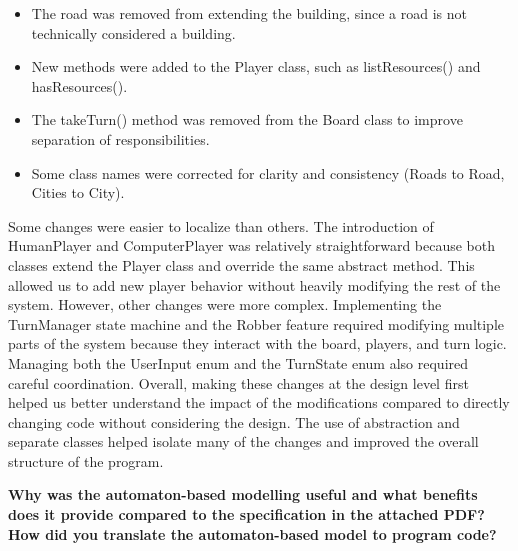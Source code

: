 \begin{itemize}
    \item The road was removed from extending the building, since a road is not technically considered a building. 
    \item New methods were added to the Player class, such as listResources() and hasResources().
    \item The takeTurn() method was removed from the Board class to improve separation of responsibilities.
    \item Some class names were corrected for clarity and consistency (Roads to Road, Cities to City). 
\end{itemize}
Some changes were easier to localize than others. The introduction of HumanPlayer and ComputerPlayer was relatively straightforward because both classes extend the Player class and override the same abstract method. This allowed us to add new player behavior without heavily modifying the rest of the system. However, other changes were more complex. Implementing the TurnManager state machine and the Robber feature required modifying multiple parts of the system because they interact with the board, players, and turn logic. Managing both the UserInput enum and the TurnState enum also required careful coordination.  \newline
\newline
Overall, making these changes at the design level first helped us better understand the impact of the modifications compared to directly changing code without considering the design. The use of abstraction and separate classes helped isolate many of the changes and improved the overall structure of the program. \newline

\textbf{Why was the automaton-based modelling useful and what benefits does it provide compared to the specification in the attached PDF? How did you translate the automaton-based model to program code?}

